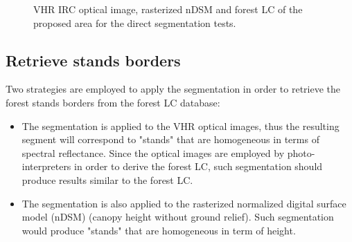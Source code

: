 \begin{figure}[htbp]
\begin{center}
\begingroup
\captionsetup[subfigure]{width=0.16\textwidth}
\endgroup
\caption{VHR IRC optical image, rasterized nDSM and forest LC of the proposed area for the direct segmentation tests.}
\label{fig:data_direct_seg}
\end{center}
\end{figure}

\subsection{Retrieve stands borders}

Two strategies are employed to apply the segmentation in order to retrieve the forest stands borders from the forest LC database:
\begin{itemize}
\item The segmentation is applied to the VHR optical images, thus the resulting segment will correspond to "stands" that are homogeneous in terms of spectral reflectance. Since the optical images are employed by photo-interpreters in order to derive the forest LC, such segmentation should produce results similar to the forest LC.
\item The segmentation is also applied to the rasterized normalized digital surface model (nDSM) (canopy height without ground relief). Such segmentation would produce "stands" that are homogeneous in term of height.
\end{itemize}

